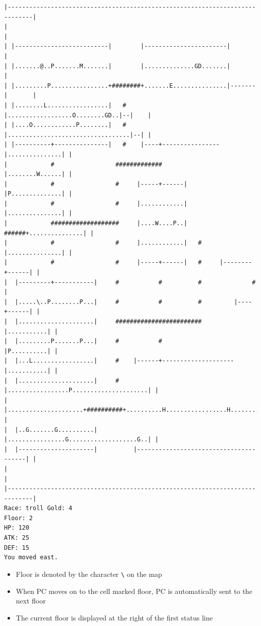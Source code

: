 \documentclass[11pt]{article}
\theoremstyle{plain}
\begin{document}
\begin{Verbatim}[fontsize=\scriptsize]
|-----------------------------------------------------------------------------|
|                                                                             |
| |--------------------------|        |-----------------------|               |
| |.......@..P.......M.......|        |..............GD.......|               |
| |.........P................+########+.......E...............|-------|       |
| |........L.................|   #    |..................O........GD..|--|    |
| |....O............P........|   #    |..................................|--| |
| |----------+---------------|   #    |----+----------------|...............| |
|            #                 #############                |........W......| |
|            #                 #     |-----+------|         |P..............| |
|            #                 #     |............|         |...............| |
|            ###################     |....W....P..|   ######+...............| |
|            #                 #     |............|   #     |...............| |
|            #                 #     |-----+------|   #     |--------+------| |
|  |---------+-----------|     #           #          #              #        |
|  |.....\..P........P...|     #           #          #         |----+------| |
|  |.....................|     ########################         |...........| |
|  |.........P.......P...|     #           #                    |P..........| |
|  |...L.................|     #    |------+--------------------|...........| |
|  |.....................|     #    |.................P.....................| |
|  |.....................+##########+..........H.................H..........| |
|  |..G.......G..........|          |................G...................G..| |
|  |---------------------|          |---------------------------------------| |
|                                                                             |
|-----------------------------------------------------------------------------|
Race: troll Gold: 4                                                    Floor: 2
HP: 120
ATK: 25
DEF: 15
You moved east. 
    \end{Verbatim}

\begin{itemize}
    \item Floor is denoted by the character \texttt{\textbackslash} on the map
    \item When PC moves on to the cell marked floor, PC is automatically
          sent to the next floor
    \item The current floor is displayed at the right of the first status line
\end{itemize}
\end{document}
